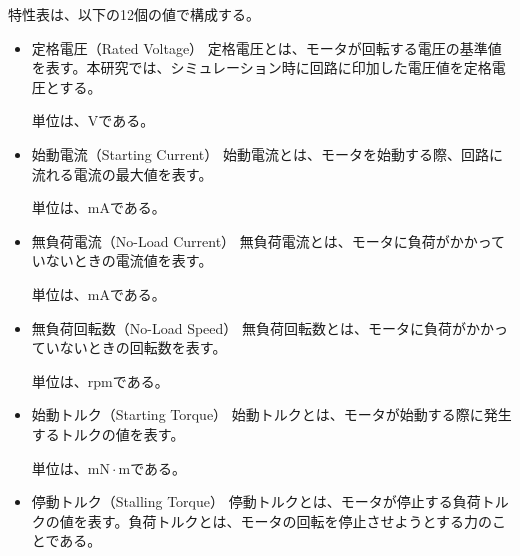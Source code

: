\documentclass[uplatex, 10pt, a4p]{jsarticle}
\begin{document}
特性表は、以下の12個の値で構成する。
\begin{itemize}
  \setlength{\itemsep}{0pt}
  \item{定格電圧（Rated Voltage）}
定格電圧とは、モータが回転する電圧の基準値を表す。本研究では、シミュレーション時に回路に印加した電圧値を定格電圧とする。

単位は、$\mathrm{V}$である。
\item{始動電流（Starting Current）}\label{sub:sub:sidouden}
始動電流とは、モータを始動する際、回路に流れる電流の最大値を表す。

単位は、$\mathrm{mA}$である。

\item{無負荷電流（No-Load Current）}
無負荷電流とは、モータに負荷がかかっていないときの電流値を表す。

単位は、$\mathrm{mA}$である。

\item{無負荷回転数（No-Load Speed）}
無負荷回転数とは、モータに負荷がかかっていないときの回転数を表す。

単位は、$\mathrm{rpm}$である。

\item{始動トルク（Starting Torque）}
始動トルクとは、モータが始動する際に発生するトルクの値を表す。

単位は、$\mathrm{mN \cdot m}$である。


\item{停動トルク（Stalling Torque）}\label{sub:sub:teidoutoruku}
停動トルクとは、モータが停止する負荷トルクの値を表す。負荷トルクとは、モータの回転を停止させようとする力のことである。


\end{itemize}
\end{document}
